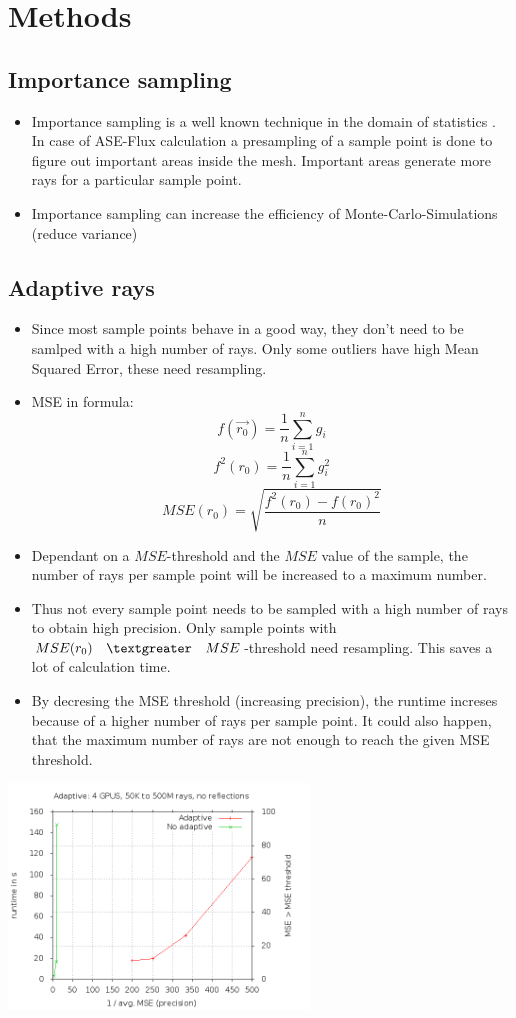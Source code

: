 \section{Methods}

\subsection{Importance sampling}
\begin{itemize}
\item Importance sampling is a well known technique in the domain
  of statistics \cite{importanceSampling}. In case of ASE-Flux calculation a presampling of
  a sample point is done to figure out important areas
  inside the mesh. Important areas generate more rays for a
  particular sample point.
\item Importance sampling can increase the efficiency of Monte-Carlo-Simulations (reduce variance)
\end{itemize}

\subsection{Adaptive rays}
\begin{itemize}
\item Since most sample points behave in a good way, they don't need
  to be samlped with a high number of rays. Only some outliers have high Mean
  Squared Error, these need resampling.
\item MSE in formula: 
     \[f(\vec{r_0}) = \frac{1}{n} \sum_{i=1}^n g_i \]
     \[f^2(r_0) = \frac{1}{n} \sum_{i=1}^n g_i^2 \]
     \[MSE(r_0) = \sqrt{\frac{f^2(r_0) - f(r_0)^2}{n}}\]
\item Dependant on a $MSE$-threshold and the $MSE$ value
  of the sample, the number of rays per sample point 
  will be increased to a maximum number.
\item Thus not every sample point needs to be sampled
  with a high number of rays to obtain high precision.
  Only sample points with $MSE(r_0) \quad \textgreater \quad MSE$-threshold need
  resampling. This saves a lot of calculation time.
\item By decresing the MSE threshold (increasing precision), the runtime increses because
  of a higher number of rays per sample point. It could also happen, that the maximum number
  of rays are not enough to reach the given MSE threshold.
\end{itemize}
\includegraphics[width=8cm]{plot/adaptive.png}
